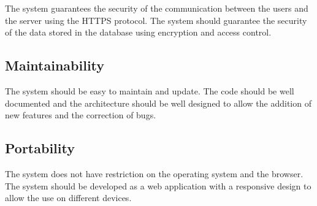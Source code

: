 The system guarantees the security of the communication between the users and the server using the HTTPS protocol. The system should guarantee the security of the data stored in the database using encryption and access control. 

\subsection{Maintainability}
\label{ss:Maintainability}%

The system should be easy to maintain and update. The code should be well documented and the architecture should be well designed to allow the addition of new features and the correction of bugs.

\subsection{Portability}
\label{ss:Portability}%

The system does not have restriction on the operating system and the browser. The system should be developed as a web application with a responsive design to allow the use on different devices.
